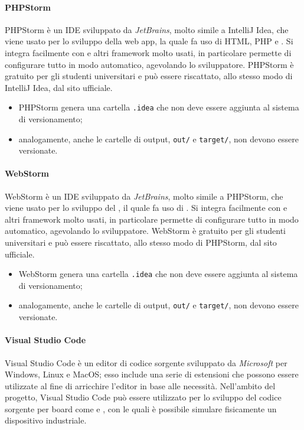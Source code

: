 				\paragraph{PHPStorm}
					PHPStorm è un IDE sviluppato da \textit{JetBrains}, molto simile a IntelliJ Idea, che viene usato per lo sviluppo della web app, la quale fa uso di HTML, PHP e . 
					\newline
					Si integra facilmente con  e altri framework molto usati, in particolare permette di configurare tutto in modo automatico, agevolando lo sviluppatore. 
					\newline
					PHPStorm è gratuito per gli studenti universitari e può essere riscattato, allo stesso modo di IntelliJ Idea, dal sito ufficiale. 

					\begin{itemize}
						\item PHPStorm genera una cartella \verb!.idea! che non deve essere aggiunta al sistema di versionamento;
						\item analogamente, anche le cartelle di output, \verb!out/! e \verb!target/!, non devono essere versionate.
					\end{itemize}
				
				\paragraph{WebStorm}
					WebStorm è un IDE sviluppato da \textit{JetBrains}, molto simile a PHPStorm, che viene usato per lo sviluppo del , il quale fa uso di .
					\newline
					Si integra facilmente con  e altri framework molto usati, in particolare permette di configurare tutto in modo automatico, agevolando lo sviluppatore.
					\newline
					WebStorm è gratuito per gli studenti universitari e può essere riscattato, allo stesso modo di PHPStorm, dal sito ufficiale. 
					
					\begin{itemize}
						\item WebStorm genera una cartella \verb!.idea! che non deve essere aggiunta al sistema di versionamento;
						\item analogamente, anche le cartelle di output, \verb!out/! e \verb!target/!, non devono essere versionate.
					\end{itemize}
				
				\paragraph{Visual Studio Code} 
					Visual Studio Code è un editor di codice sorgente sviluppato da \textit{Microsoft} per Windows, Linux e MacOS; esso include una serie di estensioni che possono essere utilizzate al fine di arricchire l'editor in base alle necessità.
					\newline
					Nell'ambito del progetto, Visual Studio Code può essere utilizzato per lo sviluppo del codice sorgente per board come  e , con le quali è possibile simulare fisicamente un dispositivo industriale.
				
